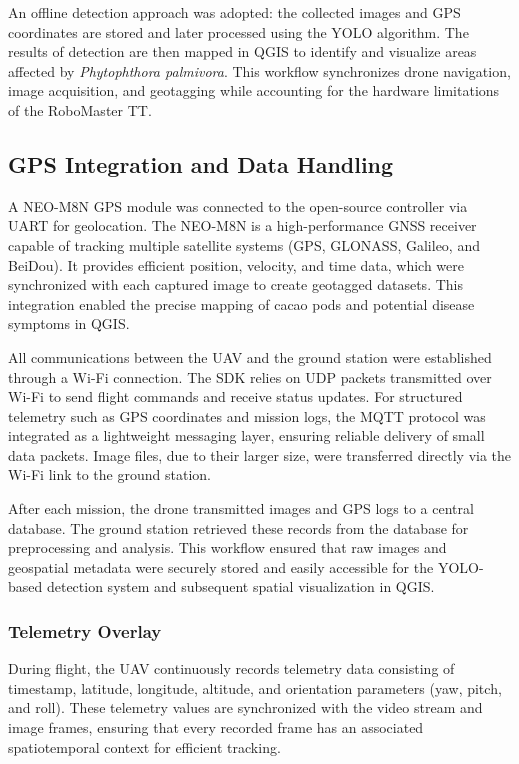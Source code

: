 An offline detection approach was adopted: the collected images and GPS coordinates are stored and later processed using the YOLO algorithm. The results of detection are then mapped in QGIS to identify and visualize areas affected by \textit{Phytophthora palmivora}. This workflow synchronizes drone navigation, image acquisition, and geotagging while accounting for the hardware limitations of the RoboMaster TT.

\subsection*{GPS Integration and Data Handling}
A NEO-M8N GPS module was connected to the open-source controller via UART for geolocation. The NEO-M8N is a high-performance GNSS receiver capable of tracking multiple satellite systems (GPS, GLONASS, Galileo, and BeiDou). It provides efficient position, velocity, and time data, which were synchronized with each captured image to create geotagged datasets. This integration enabled the precise mapping of cacao pods and potential disease symptoms in QGIS.

All communications between the UAV and the ground station were established through a Wi-Fi connection. The SDK relies on UDP packets transmitted over Wi-Fi to send flight commands and receive status updates. For structured telemetry such as GPS coordinates
and mission logs, the MQTT protocol was integrated as a lightweight messaging layer, ensuring reliable delivery of small data packets. Image files, due to their larger size, were transferred directly via the Wi-Fi link to the ground station.

After each mission, the drone transmitted images and GPS logs to a central database. The ground station retrieved these records from the database for preprocessing and analysis. This workflow ensured that raw images and geospatial metadata were securely stored and easily accessible for the YOLO-based detection system and subsequent
spatial visualization in QGIS.

\subsubsection*{Telemetry Overlay}

During flight, the UAV continuously records telemetry data consisting of timestamp, latitude, longitude, altitude, and orientation parameters (yaw, pitch, and roll). These telemetry values are synchronized with the video stream and image frames, ensuring that every recorded frame has an associated spatiotemporal context for efficient tracking.

